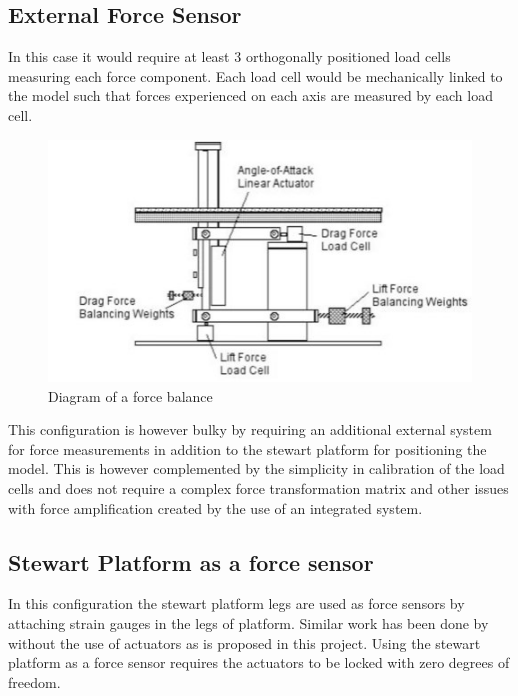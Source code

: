 \subsection{External Force Sensor}
In this case it would require at least 3 orthogonally positioned load cells measuring each force component. Each load cell would be mechanically linked to the model such that forces experienced on each axis are measured by each load cell. 
\begin{center}
	\begin{figure}[!h]
		\centering
		\includegraphics{Figures/modBal}
		\caption[Diagram of a force balance]{Diagram of a force balance \cite{post_force_2010}}
	\end{figure}
\end{center}
This configuration is however bulky by requiring an additional external system for force measurements in addition to the stewart platform for positioning the model. This is however complemented by the simplicity in calibration of the load cells and does not require a complex force transformation matrix and other issues with force amplification created by the use of an integrated system.
\subsection{Stewart Platform as a force sensor}
In this configuration the stewart platform legs are used as force sensors by attaching strain gauges in the legs of platform. Similar work has been done by \cite{ferreira2015design} without the use of actuators as is proposed in this project. Using the stewart platform as a force sensor requires the actuators to be locked with zero degrees of freedom.

